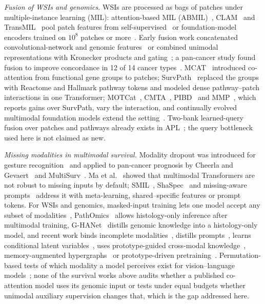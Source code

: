 \documentclass[journal]{IEEEtran}
\begin{document}
\textit{Fusion of WSIs and genomics.} WSIs are processed as bags of patches under multiple-instance learning (MIL): attention-based MIL (ABMIL)~\cite{ilse2018abmil}, CLAM~\cite{lu2021clam} and TransMIL~\cite{shao2021transmil} pool patch features from self-supervised~\cite{wang2022ctranspath} or foundation-model encoders trained on $10^8$ patches or more~\cite{chen2024uni,xu2024gigapath,vorontsov2024virchow}. Early fusion work concatenated convolutional-network and genomic features~\cite{mobadersany2018predicting} or combined unimodal representations with Kronecker products and gating~\cite{chen2022pathomic}; a pan-cancer study found fusion to improve concordance in 12 of 14 cancer types~\cite{chen2022pancancer}. MCAT~\cite{chen2021mcat} introduced co-attention from functional gene groups to patches; SurvPath~\cite{jaume2024survpath} replaced the groups with Reactome and Hallmark pathway tokens and modeled dense pathway--patch interactions in one Transformer; MOTCat~\cite{xu2023motcat}, CMTA~\cite{zhou2023cmta}, PIBD~\cite{zhang2024pibd} and MMP~\cite{song2024mmp}, which reports gains over SurvPath, vary the interaction, and continually evolved multimodal foundation models extend the setting~\cite{peng2025continual}. Two-bank learned-query fusion over patches and pathways already exists in APL~\cite{liu2025apl}; the query bottleneck used here is not claimed as new.

\textit{Missing modalities in multimodal survival.} Modality dropout was introduced for gesture recognition~\cite{neverova2016moddrop} and applied to pan-cancer prognosis by Cheerla and Gevaert~\cite{cheerla2019deep} and MultiSurv~\cite{valesilva2021long}. Ma et al.~\cite{ma2022robust} showed that multimodal Transformers are not robust to missing inputs by default; SMIL~\cite{ma2021smil}, ShaSpec~\cite{wang2023shaspec} and missing-aware prompts~\cite{lee2023prompt} address it with meta-learning, shared--specific features or prompt tokens. For WSIs and genomics, masked-input training lets one model accept any subset of modalities~\cite{cui2022incomplete}, PathOmics~\cite{ding2023pathomics} allows histology-only inference after multimodal training, G-HANet~\cite{wang2024ghanet} distills genomic knowledge into a histology-only model, and recent work binds incomplete modalities~\cite{qu2024binding}, distills prompts~\cite{xu2025dispro}, learns conditional latent variables~\cite{zhou2025ldcvae}, uses prototype-guided cross-modal knowledge~\cite{liu2025prosurv}, memory-augmented hypergraphs~\cite{qu2025m2surv} or prototype-driven pretraining~\cite{yu2026prime}. Permutation-based tests of which modality a model perceives exist for vision--language models~\cite{gat2021perceptual}; none of the survival works above audits whether a published co-attention model uses its genomic input or tests under equal budgets whether unimodal auxiliary supervision changes that, which is the gap addressed here.
\end{document}
